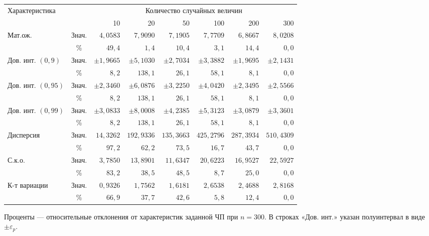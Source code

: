 \documentclass[12pt,a4paper]{article}
\begin{document}
\begin{center}\small\setlength{\tabcolsep}{3pt}\renewcommand{\arraystretch}{1.25}
\begin{tabular}{|p{31mm}|c|*{6}{r|}}
\hline
\multirow{2}{*}{Характеристика}&\multirow{2}{*}{}&\multicolumn{6}{c|}{Количество случайных величин}\\\cline{3-8}
&&10&20&50&100&200&300\\\hline
\multirow{2}{31mm}{Мат.ож.}&Знач.&$4{,}0583$&$7{,}9090$&$7{,}1905$&$7{,}7709$&$6{,}8667$&$8{,}0208$\\\cline{2-8}
&\%&$49{,}4$&$1{,}4$&$10{,}4$&$3{,}1$&$14{,}4$&$0{,}0$\\\hline
\multirow{2}{31mm}{Дов. инт. $(0{,}9)$}&Знач.&$\pm 1{,}9665$&$\pm 5{,}1030$&$\pm 2{,}7034$&$\pm 3{,}3882$&$\pm 1{,}9695$&$\pm 2{,}1431$\\\cline{2-8}
&\%&$8{,}2$&$138{,}1$&$26{,}1$&$58{,}1$&$8{,}1$&$0{,}0$\\\hline
\multirow{2}{31mm}{Дов. инт. $(0{,}95)$}&Знач.&$\pm 2{,}3460$&$\pm 6{,}0876$&$\pm 3{,}2250$&$\pm 4{,}0420$&$\pm 2{,}3495$&$\pm 2{,}5566$\\\cline{2-8}
&\%&$8{,}2$&$138{,}1$&$26{,}1$&$58{,}1$&$8{,}1$&$0{,}0$\\\hline
\multirow{2}{31mm}{Дов. инт. $(0{,}99)$}&Знач.&$\pm 3{,}0833$&$\pm 8{,}0008$&$\pm 4{,}2385$&$\pm 5{,}3123$&$\pm 3{,}0879$&$\pm 3{,}3601$\\\cline{2-8}
&\%&$8{,}2$&$138{,}1$&$26{,}1$&$58{,}1$&$8{,}1$&$0{,}0$\\\hline
\multirow{2}{31mm}{Дисперсия}&Знач.&$14{,}3262$&$192{,}9336$&$135{,}3663$&$425{,}2796$&$287{,}3934$&$510{,}4309$\\\cline{2-8}
&\%&$97{,}2$&$62{,}2$&$73{,}5$&$16{,}7$&$43{,}7$&$0{,}0$\\\hline
\multirow{2}{31mm}{С.к.о.}&Знач.&$3{,}7850$&$13{,}8901$&$11{,}6347$&$20{,}6223$&$16{,}9527$&$22{,}5927$\\\cline{2-8}
&\%&$83{,}2$&$38{,}5$&$48{,}5$&$8{,}7$&$25{,}0$&$0{,}0$\\\hline
\multirow{2}{31mm}{К-т вариации}&Знач.&$0{,}9326$&$1{,}7562$&$1{,}6181$&$2{,}6538$&$2{,}4688$&$2{,}8168$\\\cline{2-8}
&\%&$66{,}9$&$37{,}7$&$42{,}6$&$5{,}8$&$12{,}4$&$0{,}0$\\\hline
\end{tabular}
\end{center}
\noindent\small Проценты --- относительные отклонения от характеристик заданной ЧП при $n=300$. В строках «Дов. инт.» указан полуинтервал в виде $\pm\varepsilon_p$.\normalsize
\end{document}
